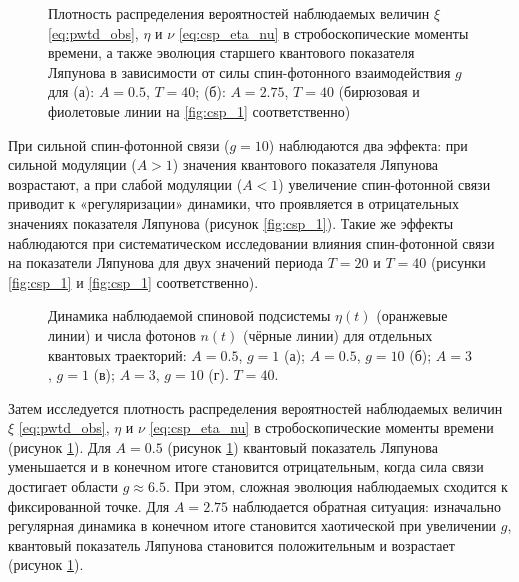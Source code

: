 \begin{figure}[h!]
	\caption[Плотность распределения вероятностей наблюдаемых величин в стробоскопические моменты времени, а также эволюция старшего квантового показателя Ляпунова в зависимости от силы спин-фотонного взаимодействия]{
		Плотность распределения вероятностей наблюдаемых величин $\xi$ \cref{eq:pwtd_obs}, $\eta$ и $\nu$ \cref{eq:csp_eta_nu} в стробоскопические моменты времени, а также эволюция старшего квантового показателя Ляпунова в зависимости от силы спин-фотонного взаимодействия $g$ для (а): $A=0.5$, $T=40$; (б): $A=2.75$, $T=40$ (бирюзовая и фиолетовые линии на \cref{fig:csp_1} соответственно)
	}
	\label{fig:csp_2}
\end{figure}

При сильной спин-фотонной связи ($g=10$) наблюдаются два эффекта: при сильной модуляции ($A>1$) значения квантового показателя Ляпунова возрастают, а при слабой модуляции ($A<1$) увеличение спин-фотонной связи приводит к «регуляризации» динамики, что проявляется в отрицательных значениях показателя Ляпунова (рисунок \cref{fig:csp_1}).
Такие же эффекты наблюдаются при систематическом исследовании влияния спин-фотонной связи на показатели Ляпунова для двух значений периода $T=20$ и $T=40$ (рисунки \cref{fig:csp_1} и \cref{fig:csp_1} соответственно).

\begin{figure}[h!]
	\caption[Динамика наблюдаемых для отдельных квантовых траекторий]{
		Динамика наблюдаемой спиновой подсистемы $\eta(t)$ (оранжевые линии) и числа фотонов $n(t)$ (чёрные линии) для отдельных квантовых траекторий: $A=0.5$, $g=1$ (а); $A=0.5$, $g=10$ (б); $A=3$, $g=1$ (в); $A=3$, $g=10$ (г). $T=40$.
	}
	\label{fig:csp_3}
\end{figure}

Затем исследуется плотность распределения вероятностей наблюдаемых величин $\xi$ \cref{eq:pwtd_obs}, $\eta$ и $\nu$ \cref{eq:csp_eta_nu} в стробоскопические моменты времени (рисунок \cref{fig:csp_2}).
Для $A=0.5$ (рисунок \cref{fig:csp_2}) квантовый показатель Ляпунова уменьшается и в конечном итоге становится отрицательным, когда сила связи достигает области $g \approx 6.5$.
При этом, сложная эволюция наблюдаемых сходится к фиксированной точке.
Для $A=2.75$ наблюдается обратная ситуация: изначально регулярная динамика в конечном итоге становится хаотической при увеличении $g$, квантовый показатель Ляпунова становится положительным и возрастает (рисунок \cref{fig:csp_2}).

